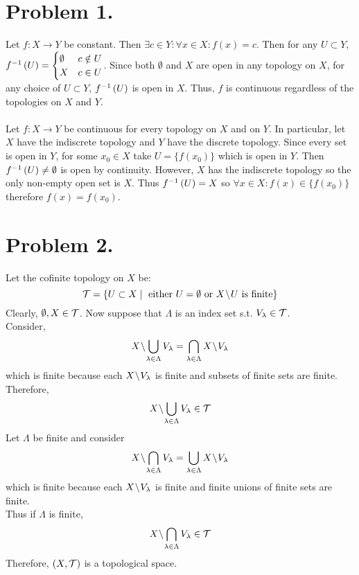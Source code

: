 \documentclass[12pt]{extarticle}
\begin{document}
 
\section*{Problem 1.}
Let $f : X \rightarrow Y$ be constant. Then $\exists c \in Y : \forall x \in X : f(x) = c$. Then for any $U \subset Y$, $f^{-1} \left( U \right) = \begin{cases} \emptyset & c \notin U \\ X & c \in U \end{cases}$. Since both $\emptyset$ and $X$ are open in any topology on $X$, for any choice of $U \subset Y$, $f^{-1} \left( U \right)$ is open in $X$. Thus, $f$ is continuous regardless of the topologies on $X$ and $Y$. \\ \\
Let $f : X \rightarrow Y$ be continuous for every topology on $X$ and on $Y$. In particular, let $X$ have the indiscrete topology and $Y$ have the discrete topology. Since every set is open in $Y$, for some $x_0 \in X$ take $U = \{f(x_0)\}$ which is open in $Y$. Then $f^{-1} \left( U \right) \neq \emptyset$ is open by continuity. However, $X$ has the indiscrete topology so the only non-empty open set is $X$. Thus $f^{-1} \left( U \right) = X$ so $\forall x \in X : f(x) \in \{ f(x_0) \}$ therefore $f(x) = f(x_0)$. 

\section*{Problem 2.}
Let the cofinite topology on $X$ be: \[\mathcal{T} = \{ U \subset X \mid \text{ either } U  = \emptyset \text{ or } X \! \setminus \! U \text{ is finite} \}\]
Clearly, $\emptyset, X \in \mathcal{T}$. Now suppose that $\Lambda$ is an index set s.t. $V_\lambda \in \mathcal{T}$. \\ Consider,  \[X \! \setminus \! \bigcup\limits_{\lambda \in \Lambda} V_\lambda = \bigcap\limits_{\lambda \in \Lambda} X \! \setminus \! V_\lambda \] which is finite because each $X \! \setminus \! V_\lambda$ is finite and subsets of finite sets are finite. Therefore, \[X \! \setminus \! \bigcup\limits_{\lambda \in \Lambda} V_\lambda \in \mathcal{T}\]
Let $\Lambda$ be finite and consider \[X \! \setminus \! \bigcap\limits_{\lambda \in \Lambda} V_\lambda = \bigcup\limits_{\lambda \in \Lambda} X \! \setminus \! V_\lambda \]
which is finite because each $X \! \setminus \! V_\lambda$ is finite and finite unions of finite sets are finite. \\ Thus if $\Lambda$ is finite, \[X \! \setminus \! \bigcap\limits_{\lambda \in \Lambda} V_\lambda \in \mathcal{T}\]
Therefore, $\left(X, \mathcal{T}\right)$ is a topological space. 
\end{document}
